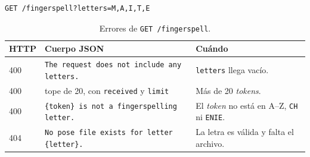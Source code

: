 \begin{lstlisting}
GET /fingerspell?letters=M,A,I,T,E
\end{lstlisting}

\begin{table}[H]
  \centering
  \caption{Errores de \texttt{GET /fingerspell}.}
  \label{tab:api-avatar-err}
  \small
  \begin{tabularx}{\textwidth}{@{}l l >{\raggedright\arraybackslash}X@{}}
    \toprule
    \textbf{HTTP} & \textbf{Cuerpo JSON} & \textbf{Cuándo} \\
    \midrule
    400 & \texttt{The request does not include any letters.} & \texttt{letters} llega vacío. \\
    400 & tope de 20, con \texttt{received} y \texttt{limit} & Más de 20 \textit{tokens}. \\
    400 & \texttt{\{token\} is not a fingerspelling letter.} & El \textit{token} no está en A--Z, \texttt{CH} ni \texttt{ENIE}. \\
    404 & \texttt{No pose file exists for letter \{letter\}.} & La letra es válida y falta el archivo. \\
    \bottomrule
  \end{tabularx}
\end{table}